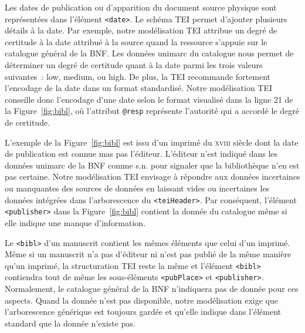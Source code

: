 \documentclass[class=article, crop=false]{standalone}
\begin{document}

Les dates de publication ou d'apparition du document source physique sont représentées dans l'élément \texttt{<date>}. Le schéma \acrshort{TEI} permet d'ajouter plusieurs détails à la date. Par exemple, notre modélisation \acrshort{TEI} attribue un degré de certitude à la date attribué à la source quand la ressource s'appuie sur le catalogue général de la \acrshort{BNF}. Les données \Gls{unimarc} du catalogue nous permet de déterminer un degré de certitude quant à la date parmi les trois valeurs suivantes~: \og{}low\fg{}, \og{}medium\fg{}, ou \og{}high\fg{}. De plus, la \acrshort{TEI} recommande fortement l'encodage de la date dans un format standardisé. Notre modélisation \acrshort{TEI} conseille donc l'encodage d'une date selon le format visualisé dans la ligne 21 de la Figure~\ref{fig:bibl}, où l'attribut \texttt{@resp} représente l'autorité qui a accordé le degré de certitude.

L'exemple de la Figure~\ref{fig:bibl} est issu d'un imprimé du \textsc{xviii} siècle dont la date de publication est connue mas pas l'éditeur. L'éditeur n'est indiqué dans les données \Gls{unimarc} de la \acrshort{BNF} comme \og{}s.n.\fg{} pour signaler que la bibliothèque n'en est pas certaine. Notre modélisation \acrshort{TEI} envisage à répondre aux données incertaines ou manquantes des sources de données en laissant vides ou incertaines les données intégrées dans l'arborescence du \texttt{<teiHeader>}. Par conséquent, l'élément \texttt{<publisher>} dans la Figure~\ref{fig:bibl} contient la donnée du catalogue même si elle indique une manque d'information.

Le \texttt{<bibl>} d'un manuscrit contient les mêmes éléments que celui d'un imprimé. Même si un manuscrit n'a pas d'éditeur ni n'est pas publié de la même manière qu'un imprimé, la structuration \acrshort{TEI} reste la même et l'élément \texttt{<bibl>} contiendra tout de même  les sous-éléments \texttt{<pubPlace>} et \texttt{<publisher>}. Normalement, le catalogue général de la \acrshort{BNF} n'indiquera pas de donnée pour ces aspects. Quand la donnée n'est pas disponible, notre modélisation exige que l'arborescence générique est toujours gardée et qu'elle indique dans l'élément standard que la donnée n'existe pas.
\end{document}
